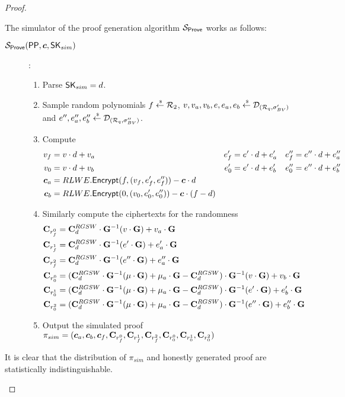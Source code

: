 \begin{proof}
\begin{description}
    The simulator of the proof generation algorithm $\mathcal{S}_{{\mathsf{Prove}}}$ works as follows:
    \begin{description}
    \item[$\mathcal{S}_{\Prove}(\PPP, \vec{c}, \SK_{sim})$]:
      \begin{enumerate}
      \item Parse $\mathsf{SK}_{sim} = d$.
      \item Sample random polynomials $f \stackrel{{\scriptscriptstyle \mkern4mu \$}}{\gets} {\mathcal{R}}_2$, $v,v_a, v_b, e, e_a, e_b \stackrel{{\scriptscriptstyle \mkern4mu \$}}{\gets} \mathcal{D}_{({\mathcal{R}}_q, \sigma_{BV}')}$ and $e'', e_a'', e_b'' \stackrel{{\scriptscriptstyle \mkern4mu \$}}{\gets} \mathcal{D}_{({\mathcal{R}}_q, \sigma_{BV}'')}$.
      \item Compute
        \begin{align*}
          v_f &= v \cdot d + v_a & e_f' &= e' \cdot d + e_a' & e_f'' &= e'' \cdot d + e_a''\\
          v_0 &= v \cdot d + v_b & e_0' &= e' \cdot d + e_b' & e_0'' &= e'' \cdot d + e_b''\\
          \vec{c}_a &= RLWE.\Enc(f, (v_f, e_f', e_f'')) - \vec{c} \cdot d \\
          \vec{c}_b &= RLWE.\Enc(0, (v_0, e_0', e_0'')) - \vec{c} \cdot (f - d)
        \end{align*}
      \item Similarly compute the ciphertexts for the randomness
        \begin{align*}
          \mathbf{C}_{r_f^0} &= \mathbf{C}_d^{RGSW} \cdot \mathbf{G}^{-1}(v \cdot \mathbf{G}) + v_a \cdot \mathbf{G} \\
          \mathbf{C}_{r_f^1} &= \mathbf{C}_d^{RGSW} \cdot \mathbf{G}^{-1}(e' \cdot \mathbf{G}) + e_a' \cdot \mathbf{G} \\
          \mathbf{C}_{r_f^2} &= \mathbf{C}_d^{RGSW} \cdot \mathbf{G}^{-1}(e'' \cdot \mathbf{G}) + e_a'' \cdot \mathbf{G} \\
          \mathbf{C}_{r_0^0} &= (\mathbf{C}_d^{RGSW} \cdot \mathbf{G}^{-1}(\mu \cdot \mathbf{G}) + \mu_a \cdot \mathbf{G} - \mathbf{C}_d^{RGSW}) \cdot \mathbf{G}^{-1}(v \cdot \mathbf{G}) + v_b \cdot \mathbf{G} \\
          \mathbf{C}_{r_0^1} &= (\mathbf{C}_d^{RGSW} \cdot \mathbf{G}^{-1}(\mu \cdot \mathbf{G}) + \mu_a \cdot \mathbf{G} - \mathbf{C}_d^{RGSW}) \cdot \mathbf{G}^{-1}(e' \cdot \mathbf{G}) + e_b' \cdot \mathbf{G} \\
          \mathbf{C}_{r_0^2} &= (\mathbf{C}_d^{RGSW} \cdot \mathbf{G}^{-1}(\mu \cdot \mathbf{G}) + \mu_a \cdot \mathbf{G} - \mathbf{C}_d^{RGSW}) \cdot \mathbf{G}^{-1}(e'' \cdot \mathbf{G}) + e_b'' \cdot \mathbf{G}
        \end{align*}
      \item Output the simulated proof $\pi_{sim} = (\vec{c}_a, \vec{c}_b, \vec{c}_f, \mat{C}_{r_f^0}, \mat{C}_{r_f^1}, \mat{C}_{r_f^2}, \mat{C}_{r_0^0}, \mat{C}_{r_0^1}, \mat{C}_{r_0^2})$
      \end{enumerate}
    \end{description}

    It is clear that the distribution of $\pi_{sim}$ and honestly generated proof are statistically indistinguishable.
  \end{description}
\end{proof}
